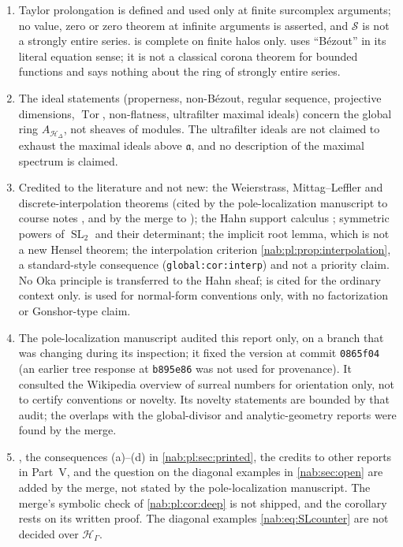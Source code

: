 \documentclass[11pt,letterpaper]{article}
\theoremstyle{definition}
\theoremstyle{remark}
\newcommand{\HH}{\mathscr H_\Gamma}
\newcommand{\SL}{\operatorname{SL}}
\newcommand{\HD}{\mathscr H_\Delta}
\newcommand{\Tor}{\operatorname{Tor}}
\numberwithin{equation}{section}
\begin{document}
\begin{enumerate}
\item\label{nab:pl:nc:halo}
Taylor prolongation is defined and used only at finite surcomplex arguments;
no value, zero or zero theorem at infinite arguments is asserted, and
$\mathcal S$ is not a strongly entire series.  is complete
on finite halos only.  uses ``B\'ezout'' in its literal
equation sense; it is not a classical corona theorem for bounded functions and
says nothing about the ring of strongly entire series.

\item\label{nab:pl:nc:ideals}
The ideal statements (properness, non-B\'ezout, regular sequence, projective
dimensions, $\Tor$, non-flatness, ultrafilter maximal ideals) concern the
global ring $A_{\HD}$, not sheaves of modules. The ultrafilter ideals are not
claimed to exhaust the maximal ideals above $\mathfrak a$, and no description of
the maximal spectrum is claimed.

\item\label{nab:pl:nc:credits}
Credited to the literature and not new: the Weierstrass, Mittag--Leffler and
discrete-interpolation theorems (cited by the pole-localization manuscript to
course notes \cite{Greenfield}, and by the merge to \cite{Rudin}); the Hahn
support calculus \cite{Poonen}; symmetric powers of $\SL_2$ and their
determinant; the implicit root lemma, which is not a new Hensel theorem; the
interpolation criterion \cref{nab:pl:prop:interpolation}, a standard-style
consequence (\nolinkurl{global:cor:interp}) and not a priority claim. No Oka
principle is transferred to the Hahn sheaf; \cite{ForstnericPrezelj} is cited
for the ordinary context only. \cite{LM} is used for normal-form conventions
only, with no factorization or Gonshor-type claim.

\item\label{nab:pl:nc:audit}
The pole-localization manuscript audited this report only, on a branch that was
changing during its inspection; it fixed the version at commit
\texttt{0865f04} (an earlier tree response at \texttt{b895e86} was not used for
provenance). It consulted the Wikipedia overview of surreal numbers for
orientation only, not to certify conventions or novelty. Its novelty statements are bounded by that
audit; the overlaps with the global-divisor and analytic-geometry reports were
found by the merge.

\item\label{nab:pl:nc:merge}
, the consequences (a)--(d) in \cref{nab:pl:sec:printed},
the credits to other reports in Part~V, and the question on the diagonal
examples in \cref{nab:sec:open} are added by the merge, not stated by the
pole-localization manuscript. The merge's symbolic check of
\cref{nab:pl:cor:deep} is not shipped, and the corollary rests on its written
proof. The diagonal examples \eqref{nab:eq:SLcounter} are not decided over
$\HH$.
\end{enumerate}
\end{document}
